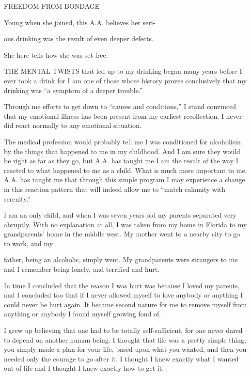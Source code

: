 
FREEDOM FROM BONDAGE

Young when she joined, this A.A. believes her seri-

ous drinking was the result of even deeper defects.

She here tells how she was set free.

      THE MENTAL TWISTS that led up to my drinking began many years before I ever took a drink for I am one of those whose history proves conclusively that my drinking was “a symptom of a deeper trouble.”

Through me efforts to get down to “causes and conditions,” I stand convinced that my emotional illness has been present from my earliest recollection. I never did react normally to any emotional situation.

The medical profession would probably tell me I was conditioned for alcoholism by the things that happened to me in my childhood. And I am sure they would be right as far as they go, but A.A. has taught me I am the result of the way I reacted to what happened to me as a child. What is much more important to me, A.A. has taught me that through this simple program I may experience a change in this reaction pattern that will indeed allow me to “match calamity with serenity.”

I am an only child, and when I was seven years old my parents separated very abruptly. With no explanation at all, I was taken from my home in Florida to my grandparents’ home in the middle west. My mother went to a nearby city to go to work, and my

father, being an alcoholic, simply went. My grandparents were strangers to me and I remember being lonely, and terrified and hurt.

In time I concluded that the reason I was hurt was because I loved my parents, and I concluded too that if I never allowed myself to love anybody or anything I could never be hurt again. It became second nature for me to remove myself from anything or anybody I found myself growing fond of.

I grew up believing that one had to be totally self-sufficient, for one never dared to depend on another human being. I thought that life was a pretty simple thing; you simply made a plan for your life, based upon what you wanted, and then you needed only the courage to go after it. I thought I knew exactly what I wanted out of life and I thought I knew exactly how to get it.

